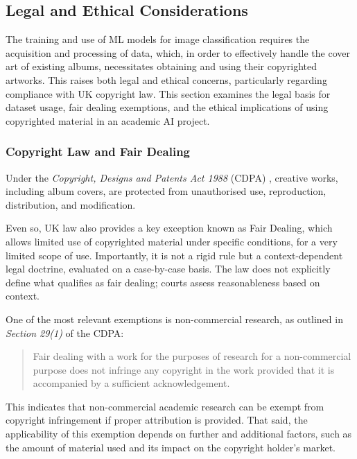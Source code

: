         \subsection{Legal and Ethical Considerations}
    
          The training and use of ML models for image classification requires the acquisition and processing of data, which, in order to effectively handle the cover art of existing albums, necessitates obtaining and using their copyrighted artworks. This raises both legal and ethical concerns, particularly regarding compliance with UK copyright law. This section examines the legal basis for dataset usage, fair dealing exemptions, and the ethical implications of using copyrighted material in an academic AI project.
    
              \subsubsection{Copyright Law and Fair Dealing}
                  Under the \textit{Copyright, Designs and Patents Act 1988} (CDPA) \cite{cdpa1988}, creative works, including album covers, are protected from unauthorised use, reproduction, distribution, and modification.
          
                  Even so, UK law also provides a key exception known as Fair Dealing, which allows limited use of copyrighted material under specific conditions, for a very limited scope of use. Importantly, it is not a rigid rule but a context-dependent legal doctrine, evaluated on a case-by-case basis. The law does not explicitly define what qualifies as fair dealing; courts assess reasonableness based on context.
                  
                  One of the most relevant exemptions is non-commercial research, as outlined in \textit{Section 29(1)} of the CDPA:
                  \begin{quote}
                      Fair dealing with a work for the purposes of research for a non-commercial purpose does not infringe any copyright in the work provided that it is accompanied by a sufficient acknowledgement. \cite{cdpa1988}
                  \end{quote}
    
                  This indicates that non-commercial academic research can be exempt from copyright infringement if proper attribution is provided. That said, the applicability of this exemption depends on further and additional factors, such as the amount of material used and its impact on the copyright holder's market.
    
